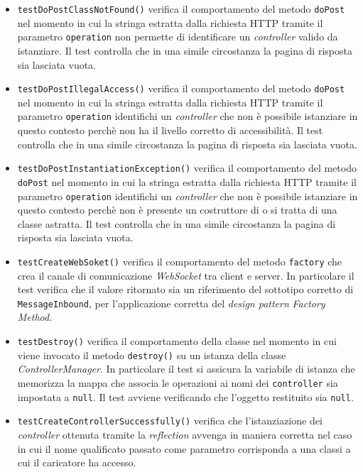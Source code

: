 \begin{itemize}
\begin{itemize}
\item \texttt{testDoPostClassNotFound()} verifica il comportamento del metodo \texttt{doPost} nel momento in cui la stringa estratta dalla richiesta HTTP tramite il parametro \texttt{operation} non permette di identificare un \textit{controller} valido da istanziare. Il test controlla che in una simile circostanza la pagina di risposta sia lasciata vuota.

\item \texttt{testDoPostIllegalAccess()} verifica il comportamento del metodo \texttt{doPost} nel momento in cui la stringa estratta dalla richiesta HTTP tramite il parametro \texttt{operation} identifichi un \textit{controller} che non è possibile istanziare in questo contesto perchè non ha il livello corretto di accessibilità. Il test controlla che in una simile circostanza la pagina di risposta sia lasciata vuota.

\item \texttt{testDoPostInstantiationException()} verifica il comportamento del metodo \texttt{doPost} nel momento in cui la stringa estratta dalla richiesta HTTP tramite il parametro \texttt{operation} identifichi un \textit{controller} che non è possibile istanziare in questo contesto perchè non è presente un costruttore di  o si tratta di una classe astratta. Il test controlla che in una simile circostanza la pagina di risposta sia lasciata vuota.

\item \texttt{testCreateWebSoket()} verifica il comportamento del metodo \texttt{factory} che crea il canale di comunicazione \textit{WebSocket} tra client e server. In particolare il test verifica che il valore ritornato sia un riferimento del sottotipo corretto di \texttt{MessageInbound}, per l'applicazione corretta del \textit{design pattern} \textit{Factory Method}.

\item \texttt{testDestroy()} verifica il comportamento della classe nel momento in cui viene invocato il metodo \texttt{destroy()} su un istanza della classe \textit{ControllerManager}. In particolare il test si assicura la variabile di istanza che memorizza la mappa che associa le operazioni ai nomi dei \texttt{controller} sia impostata a \texttt{null}.
Il test avviene verificando che l'oggetto restituito sia \texttt{null}.

\item \texttt{testCreateControllerSuccessfully()} verifica che l'istanziazione dei \textit{controller} ottenuta tramite la \textit{reflection} avvenga in maniera corretta nel caso in cui il nome qualificato passato come parametro corrisponda a una classi a cui il caricatore ha accesso.


\end{itemize}
\end{itemize}

